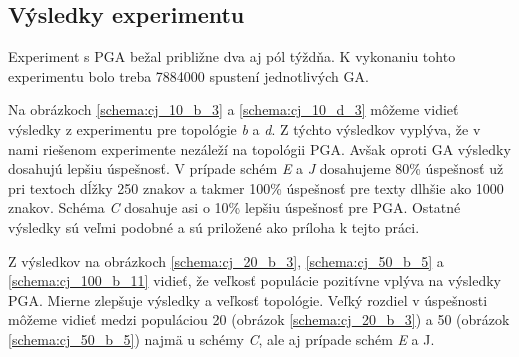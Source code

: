 \clearpage
\subsection{Výsledky experimentu}
Experiment s PGA bežal približne dva aj pól týždňa. K vykonaniu tohto experimentu bolo treba 7884000 spustení jednotlivých GA.

Na obrázkoch \ref{schema:cj_10_b_3} a \ref{schema:cj_10_d_3} môžeme vidieť výsledky z experimentu pre topológie \textit{b} a \textit{d}.
Z týchto výsledkov vyplýva, že v nami riešenom experimente nezáleží na topológii PGA. Avšak oproti GA výsledky dosahujú lepšiu úspešnosť. V prípade schém \textit{E} a \textit{J} dosahujeme 80\% úspešnosť už pri textoch dĺžky 250 znakov a takmer 100\% úspešnosť pre texty dlhšie ako 1000 znakov. Schéma \textit{C} dosahuje asi o 10\%
lepšiu úspešnosť pre PGA. Ostatné výsledky sú veľmi podobné a sú priložené ako príloha k tejto práci.

Z výsledkov na obrázkoch \ref{schema:cj_20_b_3}, \ref{schema:cj_50_b_5} a \ref{schema:cj_100_b_11} vidieť, že veľkosť populácie pozitívne vplýva na výsledky PGA.
Mierne zlepšuje výsledky a veľkosť topológie. Veľký rozdiel v úspešnosti môžeme vidieť medzi populáciou 20 (obrázok \ref{schema:cj_20_b_3}) a 50 (obrázok \ref{schema:cj_50_b_5}) najmä u schémy \textit{C}, ale aj prípade schém \textit {E} a {J}.








